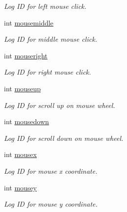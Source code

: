 \begin{DoxyCompactItemize}
\begin{DoxyCompactList}\small\item\em Log ID for left mouse click. \end{DoxyCompactList}\item 
int \hyperlink{classInput_aeada901dbf556cb13f81d8326943dd08}{mousemiddle}\hypertarget{classInput_aeada901dbf556cb13f81d8326943dd08}{}\label{classInput_aeada901dbf556cb13f81d8326943dd08}

\begin{DoxyCompactList}\small\item\em Log ID for middle mouse click. \end{DoxyCompactList}\item 
int \hyperlink{classInput_abbf0471b00d750ae25d638bca74be28f}{mouseright}\hypertarget{classInput_abbf0471b00d750ae25d638bca74be28f}{}\label{classInput_abbf0471b00d750ae25d638bca74be28f}

\begin{DoxyCompactList}\small\item\em Log ID for right mouse click. \end{DoxyCompactList}\item 
int \hyperlink{classInput_a66df7023e5db7300d0f9bcdafd140bf5}{mouseup}\hypertarget{classInput_a66df7023e5db7300d0f9bcdafd140bf5}{}\label{classInput_a66df7023e5db7300d0f9bcdafd140bf5}

\begin{DoxyCompactList}\small\item\em Log ID for scroll up on mouse wheel. \end{DoxyCompactList}\item 
int \hyperlink{classInput_a254eb8e3616257909a23449a7b87175e}{mousedown}\hypertarget{classInput_a254eb8e3616257909a23449a7b87175e}{}\label{classInput_a254eb8e3616257909a23449a7b87175e}

\begin{DoxyCompactList}\small\item\em Log ID for scroll down on mouse wheel. \end{DoxyCompactList}\item 
int \hyperlink{classInput_a332eaea23f6cb9689caaa189b11efef7}{mousex}\hypertarget{classInput_a332eaea23f6cb9689caaa189b11efef7}{}\label{classInput_a332eaea23f6cb9689caaa189b11efef7}

\begin{DoxyCompactList}\small\item\em Log ID for mouse x coordinate. \end{DoxyCompactList}\item 
int \hyperlink{classInput_a8ef4889d960150cf103f78639584c73b}{mousey}\hypertarget{classInput_a8ef4889d960150cf103f78639584c73b}{}\label{classInput_a8ef4889d960150cf103f78639584c73b}

\begin{DoxyCompactList}\small\item\em Log ID for mouse y coordinate. \end{DoxyCompactList}\end{DoxyCompactItemize}
